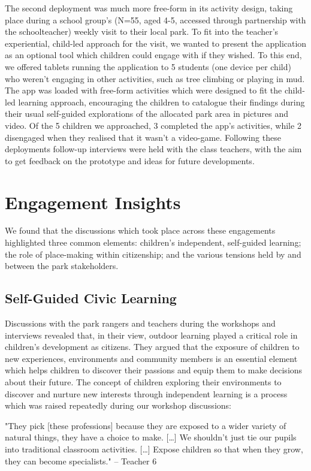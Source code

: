 The second deployment was much more free-form in its activity design, taking place during a school group’s (N=55, aged 4-5, accessed through partnership with the schoolteacher) weekly visit to their local park. To fit into the teacher’s experiential, child-led approach for the visit, we wanted to present the application as an optional tool which children could engage with if they wished. To this end, we offered tablets running the application to 5 students (one device per child) who weren't engaging in other activities, such as tree climbing or playing in mud. The app was loaded with free-form activities which were designed to fit the child-led learning approach, encouraging the children to catalogue their findings during their usual self-guided explorations of the allocated park area in pictures and video. Of the 5 children we approached, 3 completed the app’s activities, while 2 disengaged when they realised that it wasn't a video-game.
Following these deployments follow-up interviews were held with the class teachers, with the aim to get feedback on the prototype and ideas for future developments.

\section{Engagement Insights}
\label{sec:InfrastructureInsights}
We found that the discussions which took place across these engagements highlighted three common elements: children's independent, self-guided learning; the role of place-making within citizenship; and the various tensions held by and between the park stakeholders.

\subsection{Self-Guided Civic Learning}

Discussions with the park rangers and teachers during the workshops and interviews revealed that, in their view, outdoor learning played a critical role in children’s development as citizens. They argued that the exposure of children to new experiences, environments and community members is an essential element which helps children to discover their passions and equip them to make decisions about their future. The concept of children exploring their environments to discover and nurture new interests through independent learning is a process which was raised repeatedly during our workshop discussions:

\begin{displayquote}
"They pick [these professions] because they are exposed to a wider variety of natural things, they have a choice to make. […] We shouldn’t just tie our pupils into traditional classroom activities. […] Expose children so that when they grow, they can become specialists." – Teacher 6
\end{displayquote}

